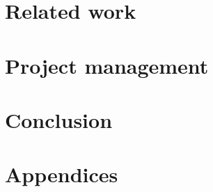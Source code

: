 \documentclass{article}
\begin{document}

\section{Related work}

\section{Project management}

\section{Conclusion}
\label{sec:conclusion}


\newpage
\nocite{*}
\printbibliography[heading=bibintoc]

\newpage
\section{Appendices}
\label{sec:appendix}

\end{document}
